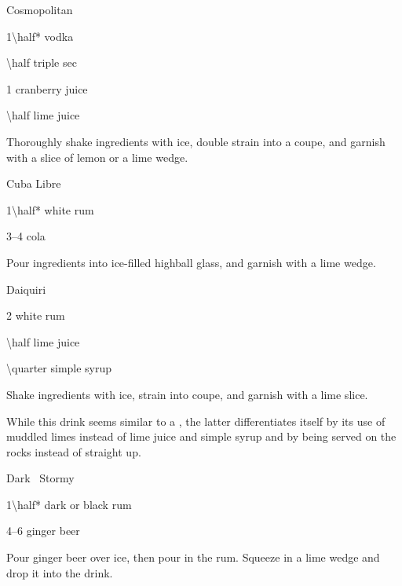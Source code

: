 \begin{Cocktail}{Cosmopolitan}
  \begin{Ingredients}
  \item \SI{1\half*}{\oz} vodka
  \item \SI{\half}{\oz} triple sec
  \item \SI{1}{\oz} cranberry juice
  \item \SI{\half}{\oz} lime juice
  \end{Ingredients}
  
  \begin{Instructions}
	Thoroughly shake ingredients with ice,  double strain into a coupe, and garnish with a slice of lemon or a lime wedge.
  \end{Instructions}
\end{Cocktail}

\begin{Cocktail}{Cuba Libre}
  \begin{Ingredients}
  \item \SI{1\half*}{\oz} white rum
  \item \SIrange{3}{4}{\oz} cola
  \end{Ingredients}
  
  \begin{Instructions}
	Pour ingredients into ice-filled highball glass, and garnish with a lime wedge.
  \end{Instructions}
\end{Cocktail}

\begin{Cocktail}{Daiquiri}
  \begin{Ingredients}
  \item \SI{2}{\oz} white rum
  \item \SI{\half}{\oz} lime juice
  \item \SI{\quarter}{\oz} simple syrup
  \end{Ingredients}
  
  \begin{Instructions}
	Shake ingredients with ice, strain into coupe, and garnish with a lime slice.
	
	While this drink seems similar to a , the latter differentiates itself by its use of muddled limes instead of lime juice and simple syrup and by being served on the rocks instead of straight up. 
  \end{Instructions}
\end{Cocktail}

\begin{Cocktail}{Dark \And\ Stormy}
  \begin{Ingredients}
  \item \SI{1\half*}{\oz} dark or black rum
  \item \SIrange{4}{6}{\oz} ginger beer
  \end{Ingredients}
  
  \begin{Instructions}
	Pour ginger beer over ice, then pour in the rum.  Squeeze in a lime wedge and drop it into the drink.
  \end{Instructions}
\end{Cocktail}

